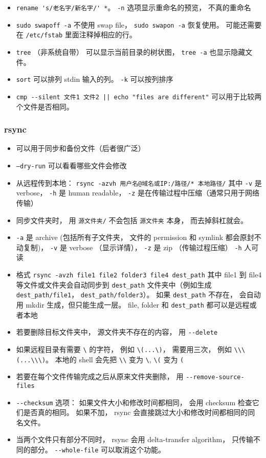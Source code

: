 \begin{itemize}
\item \verb|rename 's/老名字/新名字/' *|。 \verb|-n| 选项显示重命名的预览， 不真的重命名
\item \verb|sudo swapoff -a| 不使用 swap file， \verb|sudo swapon -a| 恢复使用。 可能还需要在 \verb|/etc/fstab| 里面注释掉相应的行。
\item \verb|tree| （非系统自带） 可以显示当前目录的树状图， \verb|tree -a| 也显示隐藏文件。
\item \verb|sort| 可以排列 stdin 输入的列。 \verb|-k| 可以按列排序
\item \verb`cmp --silent 文件1 文件2 || echo "files are different"` 可以用于比较两个文件是否相同。
\end{itemize}

\subsubsection{rsync}
\begin{itemize}
\item 可以用于同步和备份文件（后者很广泛）
\item \verb|–dry-run| 可以看看哪些文件会修改
\item 从远程传到本地： \verb|rsync -azvh 用户名@域名或IP:/路径/* 本地路径/| 其中 \verb|-v| 是 verbose， \verb|-h| 是 human readable， \verb|-z| 是在传输过程中压缩（通常只用于网络传输）
\item 同步文件夹时， 用 \verb|源文件夹/| 不会包括 \verb|源文件夹| 本身， 而去掉斜杠就会。
\item \verb`-a` 是 archive (包括所有子文件夹， 文件的 permission 和 symlink 都会原封不动复制)， \verb`-v` 是 verbose （显示详情）， \verb`-z` 是 zip （传输过程压缩） \verb`-h` 人可读
\item 格式 \verb`rsync -avzh file1 file2 folder3 file4 dest_path` 其中 file1 到 file4 等文件或文件夹会自动同步到 \verb|dest_path| 文件夹中（例如生成 \verb`dest_path/file1`， \verb`dest_path/folder3`）。 如果 \verb|dest_path| 不存在， 会自动用 mkdir 生成，但只能生成一层。 file, folder 和 \verb|dest_path| 都可以是远程或者本地
\item 若要删除目标文件夹中， 源文件夹不存在的内容， 用 \verb`--delete`
\item 如果远程目录有需要 \verb`\` 的字符， 例如 \verb`\(...\)`， 需要用三次， 例如 \verb`\\\(...\\\)`。 本地的 shell 会先把 \verb`\\` 变为 \verb`\`, \verb`\(` 变为 \verb`(`
\item 若要在每个文件传输完成之后从原来文件夹删除， 用 \verb`--remove-source-files`
\item \verb|--checksum| 选项： 如果文件大小和修改时间都相同， 会用 checksum 检查它们是否真的相同。 如果不加， rsync 会直接跳过大小和修改时间都相同的同名文件。
\item 当两个文件只有部分不同时， rsync 会用 delta-transfer algorithm， 只传输不同的部分。 \verb|--whole-file| 可以取消这个功能。
\end{itemize}


